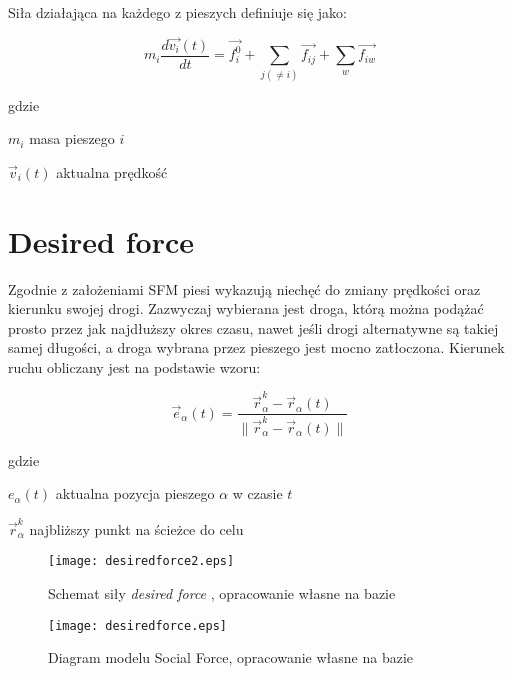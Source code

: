 Siła działająca na każdego z pieszych definiuje się jako:

\begin{samepage}
\begin{equation}
m_{i} \frac{d\vec{v_{i}}(t)}{dt} = \vec{f_{i}^{0}} + \sum_{j(\neq i)} \vec{f_{ij}} + \sum _{w} \vec{f_{iw}}
\end{equation}

gdzie
\begin{eqwhere}[2cm]
	\item[$m_{i}$] masa pieszego $i$
	\item[$\vec{v}_{i}(t)$] aktualna prędkość
\end{eqwhere}
\end{samepage}

\section{Desired force}
\label{sec:desiredForce}

Zgodnie z założeniami SFM piesi wykazują niechęć do zmiany prędkości oraz kierunku swojej drogi. Zazwyczaj wybierana jest droga, którą można podążać prosto przez jak najdłuższy okres czasu, nawet jeśli drogi alternatywne są takiej samej długości, a droga wybrana przez pieszego jest mocno zatłoczona. Kierunek ruchu obliczany jest na podstawie wzoru:

\begin{equation}
\vec{e}_{\alpha}(t) = \frac{\vec{r}_{\alpha}^{k} - \vec{r}_{\alpha}(t)}{\parallel \vec{r}_{\alpha}^{k} - \vec{r}_{\alpha}(t) \parallel}
\end{equation}

gdzie
\begin{eqwhere}[2cm]
	\item[$e_{\alpha}(t)$] aktualna pozycja pieszego $\alpha$ w czasie $t$
	\item[$\vec{r}_{\alpha}^{k}$] najbliższy punkt na ścieżce do celu
\end{eqwhere}

\begin{figure}
\centering
\texttt{[image: desiredforce2.eps]}
\caption{Schemat siły \textit{desired force} , opracowanie własne na bazie \cite{AMSFMfPBSaSC}}
\end{figure}

\begin{figure}
\centering
\texttt{[image: desiredforce.eps]}
\caption{Diagram modelu Social Force, opracowanie własne na bazie \cite{GuideCrowdDynViaModifiedSocialForceModel}}
\end{figure}


